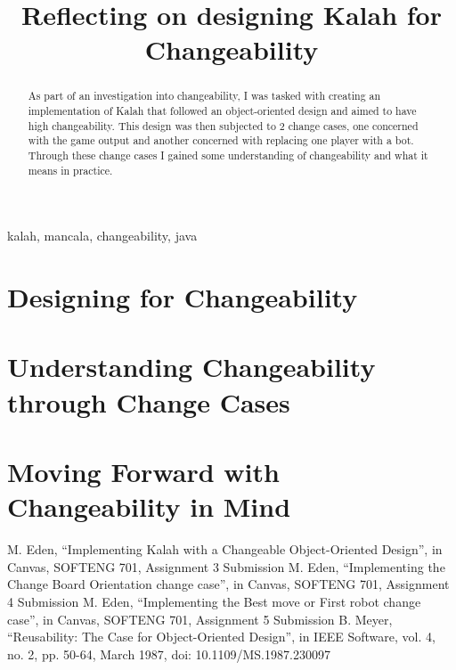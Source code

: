 \documentclass[10pt, a4paper, conference]{IEEEtran}
\begin{document}
\title{Reflecting on designing Kalah for Changeability}

\author{
}

\maketitle

\begin{abstract}
  As part of an investigation into changeability, I was tasked with creating an
  implementation of Kalah that followed an object-oriented design and aimed to
  have high changeability. This design was then subjected to 2 change cases,
  one concerned with the game output and another concerned with replacing one
  player with a bot. Through these change cases I gained some understanding of
  changeability and what it means in practice.
\end{abstract}

\begin{IEEEkeywords}
kalah, mancala, changeability, java
\end{IEEEkeywords}

\section{Designing for Changeability}
\section{Understanding Changeability through Change Cases}
\section{Moving Forward with Changeability in Mind}

\begin{thebibliography}{00}
   M. Eden, ``Implementing Kalah with a Changeable
    Object-Oriented Design'', in Canvas, SOFTENG 701, Assignment 3 
    Submission
   M. Eden, ``Implementing the Change Board Orientation
    change case'', in Canvas, SOFTENG 701, Assignment 4 Submission
   M. Eden, ``Implementing the Best move or First robot
    change case'', in Canvas, SOFTENG 701, Assignment 5 Submission
   B. Meyer, ``Reusability: The Case for Object-Oriented
    Design'', in IEEE Software, vol. 4, no. 2, pp. 50-64, March 1987, 
    doi: 10.1109/MS.1987.230097
\end{thebibliography}
\end{document}
